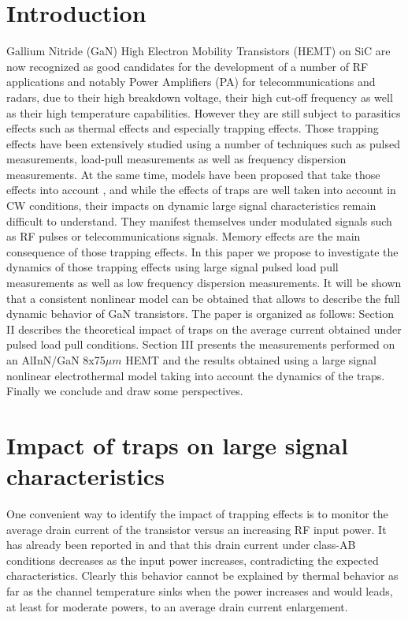 \documentclass[conference]{IEEEtran}
\begin{document}

\section{Introduction}
Gallium Nitride (GaN) High Electron Mobility Transistors (HEMT) on SiC are now recognized as good candidates for the development of a number of RF applications and notably Power Amplifiers (PA) for telecommunications and radars, due to their high breakdown voltage, their high cut-off frequency as well as their high temperature capabilities. However they are still subject to parasitics effects such as thermal effects and especially trapping effects. Those trapping effects have been extensively studied using a number of techniques such as pulsed measurements, load-pull measurements as well as frequency dispersion measurements. At the same time, models have been proposed that take those effects into account \cite{5296056, Leoni2001, 5516843}, and while the effects of traps are well taken into account in CW conditions, their impacts on dynamic large signal characteristics remain difficult to understand. They manifest themselves under modulated signals such as RF pulses or telecommunications signals. Memory effects are the main consequence of those trapping effects. In this paper we propose to investigate the dynamics of those trapping effects using large signal pulsed load pull measurements as well as low frequency dispersion measurements. It will be shown that a consistent nonlinear model can be obtained that allows to describe the full dynamic behavior of GaN transistors. The paper is organized as follows: Section II describes the theoretical impact of traps on the average current obtained under pulsed load pull conditions. Section III presents the measurements performed on an AlInN/GaN 8x75$\mu m$ HEMT and the results obtained using a large signal nonlinear electrothermal model taking into account the dynamics of the traps. Finally we conclude and draw some perspectives. 



\section{Impact of traps on large signal characteristics}
One convenient way to identify the impact of trapping effects is to monitor the average drain current of the transistor versus an increasing RF input power. It has already been reported in \cite{5296056} and \cite{5516843} that this drain current under class-AB conditions decreases as the input power increases, contradicting the expected characteristics. Clearly this behavior cannot be explained by thermal behavior as far as the channel temperature sinks when the power increases and would leads, at least for moderate powers, to an average drain current enlargement. 
\end{document}
